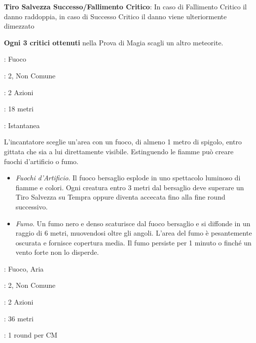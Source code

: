 \begin{multicols}{2}
\textbf{Tiro Salvezza Successo/Fallimento Critico}: In caso di Fallimento Critico il danno raddoppia, in caso di Successo Critico il danno viene ulteriormente dimezzato

\textbf{Ogni 3 critici ottenuti} nella Prova di Magia scagli un altro meteorite.

\noindent\colorbox{OBSSgold!10}{
\begin{minipage}{0.95\linewidth}
\begin{description}[noitemsep, topsep=0pt, parsep=0pt, partopsep=0pt, leftmargin=0cm, labelwidth=1.3cm]
	\item[\textbf{Lista}]: Fuoco
	\item[\textbf{Livello}]: 2, Non Comune
	\item[\textbf{Lancio}]: 2 Azioni
	\item[\textbf{Gittata}]: 18 metri
	\item[\textbf{Durata}]: Istantanea
\end{description}
\end{minipage}}\smallskip

L'incantatore sceglie un'area con un fuoco, di almeno 1 metro di spigolo, entro gittata che sia a lui direttamente visibile. Estinguendo le fiamme può creare fuochi d'artificio o fumo.

\begin{itemize}[leftmargin=*] \setlength{\itemsep}{0pt}
	\item \emph{Fuochi d'Artificio}. Il fuoco bersaglio esplode in uno spettacolo luminoso di fiamme e colori. Ogni creatura entro 3 metri dal bersaglio deve superare un Tiro Salvezza su Tempra oppure diventa accecata fino alla fine round successivo.
	\item \emph{Fumo}. Un fumo nero e denso scaturisce dal fuoco bersaglio e si diffonde in un raggio di 6 metri, muovendosi oltre gli angoli. L'area del fumo è pesantemente oscurata e fornisce copertura media. Il fumo persiste per 1 minuto o finché un vento forte non lo disperde.
\end{itemize}

\noindent\colorbox{OBSSgold!10}{
\begin{minipage}{0.95\linewidth}
\begin{description}[noitemsep, topsep=0pt, parsep=0pt, partopsep=0pt, leftmargin=0cm, labelwidth=1.3cm]
	\item[\textbf{Lista}]: Fuoco, Aria
	\item[\textbf{Livello}]: 2, Non Comune
	\item[\textbf{Lancio}]: 2 Azioni
	\item[\textbf{Gittata}]: 36 metri
	\item[\textbf{Durata}]: 1 round per CM
\end{description}
\end{minipage}}\smallskip


\end{multicols}
